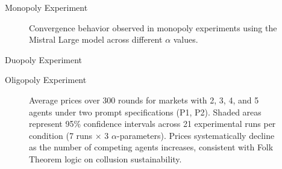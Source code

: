 \documentclass[10pt, aspectratio=169]{beamer}
\begin{document}
\begin{frame}{Monopoly Experiment}
\begin{figure}[htpb!]
    \centering
    
    \caption{Convergence behavior observed in monopoly experiments using the Mistral Large model across different $\alpha$ values.}
    \label{fig:monopoly_convergence}
\end{figure}
\end{frame}

\begin{frame}{Duopoly Experiment}
\centering
\begin{minipage}[b]{0.48\linewidth}
    \centering
    
    
\end{minipage}
\hfill
\begin{minipage}[b]{0.48\linewidth}
    \centering
    
    
\end{minipage}
\end{frame}

\begin{frame}{Oligopoly Experiment}
    \begin{figure}[htpb!]
        \centering
        
        \caption{Average prices over 300 rounds for markets with 2, 3, 4, and 5 agents under two prompt specifications (P1, P2). Shaded areas represent 95\% confidence intervals across 21 experimental runs per condition (7 runs × 3 $\alpha$-parameters). Prices systematically decline as the number of competing agents increases, consistent with Folk Theorem logic on collusion sustainability.}
        \label{fig:ts_prices_comb}
    \end{figure}
\end{frame}
\end{document}
